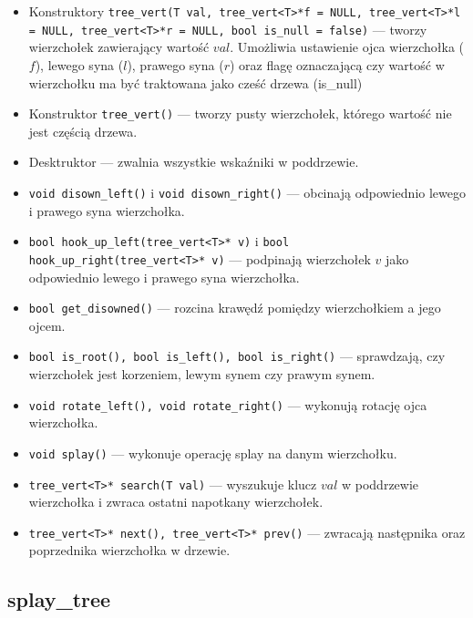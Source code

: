 \documentclass[declaration,shortabstract]{iithesis}
\theoremstyle{thm}
\theoremstyle{remark}
\theoremstyle{plain}
\theoremstyle{plain}
\theoremstyle{plain}
\begin{document}
\begin{itemize}

\item{Konstruktory \texttt{tree\_vert(T val, tree\_vert<T>*f = NULL, tree\_vert<T>*l = NULL, tree\_vert<T>*r = NULL, bool is\_null = false)} --- tworzy wierzchołek zawierający wartość $val$. Umożliwia ustawienie ojca wierzchołka ($f$), lewego syna ($l$), prawego syna ($r$) oraz flagę oznaczającą czy wartość w wierzchołku ma być traktowana jako cześć drzewa (is\_null)}
\item{Konstruktor \texttt{tree\_vert()} --- tworzy pusty wierzchołek, którego wartość nie jest częścią drzewa.}

\item{Desktruktor --- zwalnia wszystkie wskaźniki w poddrzewie.}

\item{\texttt{void disown\_left()} i \texttt{void disown\_right()} --- obcinają odpowiednio lewego i prawego syna wierzchołka.}
    
\item{\texttt{bool hook\_up\_left(tree\_vert<T>* v)} i \texttt{bool hook\_up\_right(tree\_vert<T>* v)} --- podpinają wierzchołek $v$ jako odpowiednio lewego i prawego syna wierzchołka.}

\item{\texttt{bool get\_disowned()} --- rozcina krawędź pomiędzy wierzchołkiem a jego ojcem.}

\item{\texttt{bool is\_root(), bool is\_left(),  bool is\_right()} --- sprawdzają, czy \\wierzchołek jest korzeniem, lewym synem czy prawym synem.}

\item{\texttt{void rotate\_left(), void rotate\_right()} --- wykonują rotację ojca wierzchołka.}
    
\item{\texttt{void splay()} --- wykonuje operację splay na danym wierzchołku.}
    
\item{\texttt{tree\_vert<T>* search(T val)} --- wyszukuje klucz $val$ w poddrzewie wierzchołka i zwraca ostatni napotkany wierzchołek.}
   
\item{\texttt{tree\_vert<T>* next(), tree\_vert<T>* prev()} --- zwracają następnika oraz poprzednika wierzchołka w drzewie.}
\end{itemize}

\subsection{splay\_tree}
\end{document}
